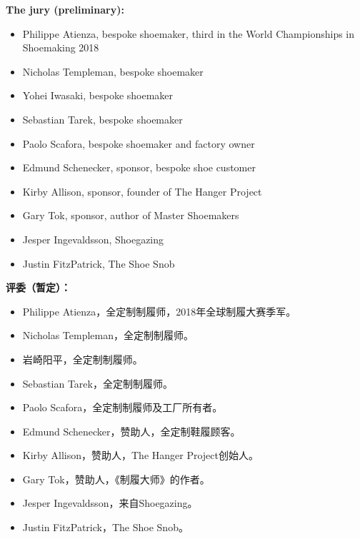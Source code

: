 \begin{paracol}{2}
        \textbf{The jury (preliminary):}
        \begin{itemize}
            \item Philippe Atienza, bespoke shoemaker, third in the World Championships in Shoemaking 2018
            \item Nicholas Templeman, bespoke shoemaker
            \item Yohei Iwasaki, bespoke shoemaker
            \item Sebastian Tarek, bespoke shoemaker
            \item Paolo Scafora, bespoke shoemaker and factory owner
            \item Edmund Schenecker, sponsor, bespoke shoe customer
            \item Kirby Allison, sponsor, founder of The Hanger Project
            \item Gary Tok, sponsor, author of Master Shoemakers
            \item Jesper Ingevaldsson, Shoegazing
            \item Justin FitzPatrick, The Shoe Snob
        \end{itemize}

        \vspace{1em}

        \switchcolumn
        \textbf{评委（暂定）：}
        \begin{itemize}
            \item Philippe Atienza，全定制制履师，2018年全球制履大赛季军。
            \item Nicholas Templeman，全定制制履师。
            \item 岩崎阳平，全定制制履师。
            \item Sebastian Tarek，全定制制履师。
            \item Paolo Scafora，全定制制履师及工厂所有者。
            \item Edmund Schenecker，赞助人，全定制鞋履顾客。
            \item Kirby Allison，赞助人，The Hanger Project创始人。
            \item Gary Tok，赞助人，《制履大师》的作者。
            \item Jesper Ingevaldsson，来自Shoegazing。
            \item Justin FitzPatrick，The Shoe Snob。
        \end{itemize}
        \switchcolumn*


\end{paracol}
